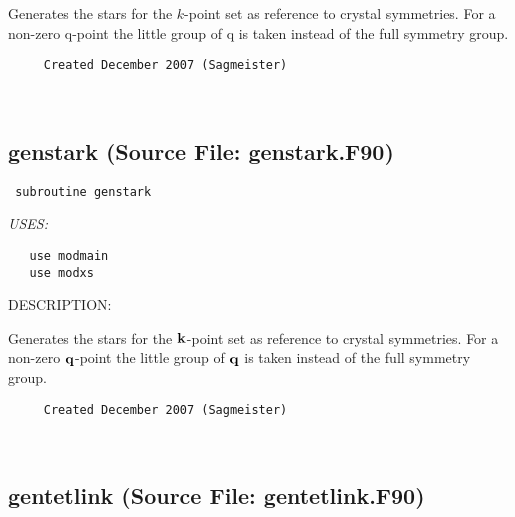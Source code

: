 \documentclass[11pt]{article}
\begin{document}
     Generates the stars for the $k$-point set as reference to crystal
     symmetries. For a non-zero q-point the little group of q is taken
     instead of the full symmetry group.
  
\begin{verbatim}     Created December 2007 (Sagmeister)\end{verbatim}


 
 
\mbox{}\hrulefill\ 
 
\subsection{genstark (Source File: genstark.F90)}


\begin{verbatim} subroutine genstark\end{verbatim}{\em USES:}
\begin{verbatim}   use modmain
   use modxs\end{verbatim}
{\sf DESCRIPTION:\\ }


     Generates the stars for the ${\bf k}$-point set as reference to crystal
     symmetries. For a non-zero ${\bf q}$-point the little group of ${\bf q}$
     is taken instead of the full symmetry group.
  
\begin{verbatim}     Created December 2007 (Sagmeister)\end{verbatim}






 
 
\mbox{}\hrulefill\ 
 
\subsection{gentetlink (Source File: gentetlink.F90)}
\end{document}
